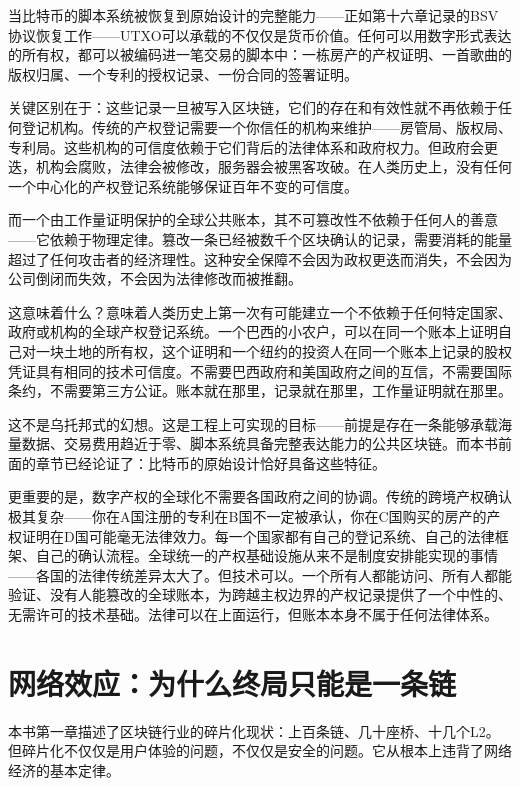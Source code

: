 \documentclass[a4paper,12pt,openany]{ctexbook}
\begin{document}
当比特币的脚本系统被恢复到原始设计的完整能力——正如第十六章记录的BSV协议恢复工作——UTXO可以承载的不仅仅是货币价值。任何可以用数字形式表达的所有权，都可以被编码进一笔交易的脚本中：一栋房产的产权证明、一首歌曲的版权归属、一个专利的授权记录、一份合同的签署证明。

关键区别在于：这些记录一旦被写入区块链，它们的存在和有效性就不再依赖于任何登记机构。传统的产权登记需要一个你信任的机构来维护——房管局、版权局、专利局。这些机构的可信度依赖于它们背后的法律体系和政府权力。但政府会更迭，机构会腐败，法律会被修改，服务器会被黑客攻破。在人类历史上，没有任何一个中心化的产权登记系统能够保证百年不变的可信度。

而一个由工作量证明保护的全球公共账本，其不可篡改性不依赖于任何人的善意——它依赖于物理定律。篡改一条已经被数千个区块确认的记录，需要消耗的能量超过了任何攻击者的经济理性。这种安全保障不会因为政权更迭而消失，不会因为公司倒闭而失效，不会因为法律修改而被推翻。

这意味着什么？意味着人类历史上第一次有可能建立一个不依赖于任何特定国家、政府或机构的全球产权登记系统。一个巴西的小农户，可以在同一个账本上证明自己对一块土地的所有权，这个证明和一个纽约的投资人在同一个账本上记录的股权凭证具有相同的技术可信度。不需要巴西政府和美国政府之间的互信，不需要国际条约，不需要第三方公证。账本就在那里，记录就在那里，工作量证明就在那里。

这不是乌托邦式的幻想。这是工程上可实现的目标——前提是存在一条能够承载海量数据、交易费用趋近于零、脚本系统具备完整表达能力的公共区块链。而本书前面的章节已经论证了：比特币的原始设计恰好具备这些特征。

更重要的是，数字产权的全球化不需要各国政府之间的协调。传统的跨境产权确认极其复杂——你在A国注册的专利在B国不一定被承认，你在C国购买的房产的产权证明在D国可能毫无法律效力。每一个国家都有自己的登记系统、自己的法律框架、自己的确认流程。全球统一的产权基础设施从来不是制度安排能实现的事情——各国的法律传统差异太大了。但技术可以。一个所有人都能访问、所有人都能验证、没有人能篡改的全球账本，为跨越主权边界的产权记录提供了一个中性的、无需许可的技术基础。法律可以在上面运行，但账本本身不属于任何法律体系。


\section*{网络效应：为什么终局只能是一条链}


本书第一章描述了区块链行业的碎片化现状：上百条链、几十座桥、十几个L2。但碎片化不仅仅是用户体验的问题，不仅仅是安全的问题。它从根本上违背了网络经济的基本定律。
\end{document}
